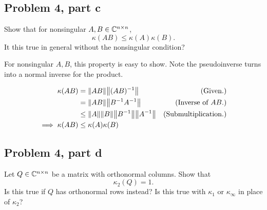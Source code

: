 \subsection{Problem 4, part c}
Show that for nonsingular $A, B \in \mathbb{C}^{n\times n}$, 
\[
\kappa(AB)\leq \kappa(A)\kappa(B).
\]
 It this true in general without the nonsingular condition?
 \partbreak
 \begin{solution}

     For nonsingular $A, B$, this property is easy to show. Note the pseudoinverse turns into a normal inverse for the product.

     \alignbreak
     \begin{align}
         \kappa(AB) &= \norm{AB}\norm{(AB)^{-1}} &\text{(Given.)}\nonumber\\
         &= \norm{AB} \norm{B^{-1}A^{-1}} &\text{(Inverse of $AB$.)}\nonumber\\
         &\leq \norm{A} \norm{B} \norm{B^{-1}} \norm{A^{-1}} &\text{(Submultiplication.)}\nonumber\\
         \implies \kappa(AB) &\leq \kappa(A)\kappa(B)\nonumber
     \end{align}
     \alignbreak
 \end{solution}

\newpage
 \subsection{Problem 4, part d}
 Let $Q \in \mathbb{C}^{n\times n}$ be a matrix with orthonormal columns. Show that 
 \[
 \kappa_2(Q) = 1.
 \]
 Is this true if $Q$ has orthonormal rows instead? Is this true with $\kappa_1$ or $\kappa_\infty$ in place of $\kappa_2$?
 \partbreak
 \begin{solution}
     
 \end{solution}

